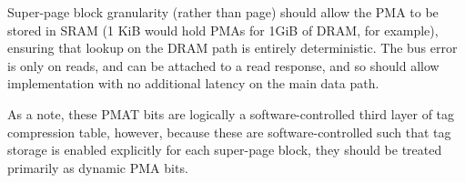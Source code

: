 Super-page block granularity (rather than page) should allow the PMA to be stored in SRAM (1 KiB would hold PMAs for 1GiB of DRAM, for example), ensuring that lookup on the DRAM path is entirely deterministic.
The bus error is only on reads, and can be attached to a read response, and so should allow implementation with no additional latency on the main data path.

As a note, these PMAT bits are logically a software-controlled third layer of tag compression table, however, because these are software-controlled such that tag storage is enabled explicitly for each super-page block, they should be treated primarily as dynamic PMA bits.
